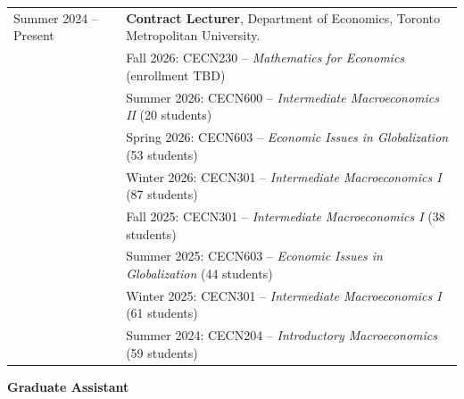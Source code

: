 \documentclass[11pt]{article}
\begin{document}
\begin{tabular}{p{2.5cm} p{15cm}}
  Summer 2024 -- Present &
    \textbf{Contract Lecturer}, Department of Economics, Toronto Metropolitan University.
    \\[-1pt]
  & {\scriptsize Fall 2026: CECN230 -- \textit{Mathematics for Economics} (enrollment TBD)} \\
  & {\scriptsize Summer 2026: CECN600 -- \textit{Intermediate Macroeconomics II} (20 students)} \\
  & {\scriptsize Spring 2026: CECN603 -- \textit{Economic Issues in Globalization} (53 students)} \\
  & {\scriptsize Winter 2026: CECN301 -- \textit{Intermediate Macroeconomics I} (87 students)} \\
  & {\scriptsize Fall 2025: CECN301 -- \textit{Intermediate Macroeconomics I} (38 students)} \\
  & {\scriptsize Summer 2025: CECN603 -- \textit{Economic Issues in Globalization} (44 students)} \\
  & {\scriptsize Winter 2025: CECN301 -- \textit{Intermediate Macroeconomics I} (61 students)} \\
  & {\scriptsize Summer 2024: CECN204 -- \textit{Introductory Macroeconomics} (59 students)} \\
\end{tabular}

\vspace{9pt}
\textbf{Graduate Assistant}\\[3pt]
\end{document}
